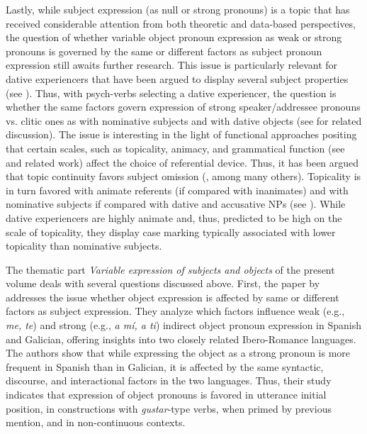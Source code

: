 \documentclass[output=paper]{langscibook}
\begin{document}
Lastly, while subject expression (as null or strong pronouns) is a topic that has received considerable attention from both theoretic and data-based perspectives, the question of whether variable object pronoun expression as weak or strong pronouns is governed by the same or different factors as subject pronoun expression still awaits further research. This issue is particularly relevant for dative experiencers that have been argued to display several subject properties (see \citealt{Masulló1993}). Thus, with psych-verbs selecting a dative experiencer, the question is whether the same factors govern expression of strong speaker/addressee pronouns vs. clitic ones as with nominative subjects and with dative objects (see   for related discussion). The issue is interesting in the light of functional approaches positing that certain scales, such as topicality, animacy, and grammatical function (see \citealt{Givón1983} and related work) affect the choice of referential device. Thus, it has been argued that topic continuity favors subject omission (\citealt{Givón1983, Bentivoglio1983}, among many others). Topicality is in turn favored with animate referents (if compared with inanimates) and with nominative subjects if compared with dative and accusative NPs (see \citealt{Givón1983}). While dative experiencers are highly animate and, thus, predicted to be high on the scale of topicality, they display case marking typically associated with lower topicality than nominative subjects. 



The thematic part \textit{Variable expression of subjects and objects} of the present volume deals with several questions discussed above. First, the paper by  addresses the issue whether object expression is affected by same or different factors as subject expression. They analyze which factors influence weak (e.g., \textit{me, te}) and strong (e.g., \textit{a mí, a ti}) indirect object pronoun expression in Spanish and Galician, offering insights into two closely related Ibero-Romance languages. The authors show that while expressing the object as a strong pronoun is more frequent in Spanish than in Galician, it is affected by the same syntactic, discourse, and interactional factors in the two languages. Thus, their study indicates that expression of  object pronouns is favored in utterance initial position, in constructions with \textit{gustar}-type verbs, when primed by previous mention, and in non-continuous contexts.
\end{document}
